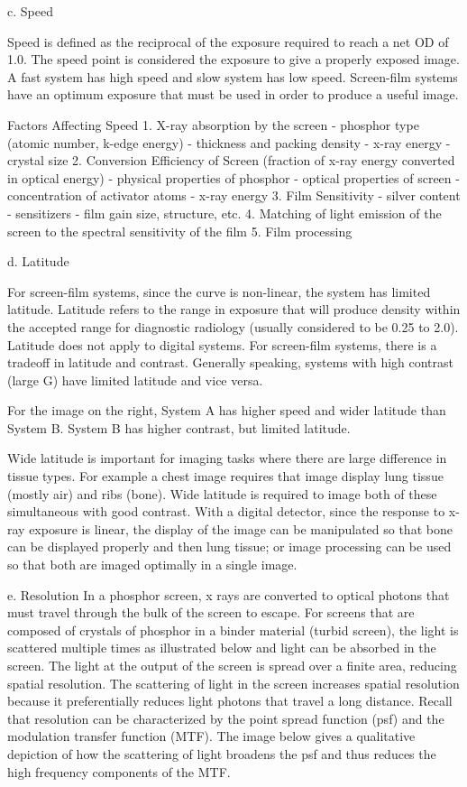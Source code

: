 \documentclass[mphy386-notes.tex]{subfiles}
\begin{document}
c. Speed 

Speed is defined as the reciprocal of the exposure required to reach a net OD of
1.0. The speed point is considered the exposure to give a properly exposed
image. A fast system has high speed and slow system has low speed.  Screen-film
systems have an optimum exposure that must be used in order to produce a useful
image.

Factors Affecting Speed
1.  X-ray absorption by the screen
- phosphor type (atomic number, k-edge energy)
- thickness and packing density
- x-ray energy
- crystal size
2.  Conversion Efficiency of Screen (fraction of x-ray energy converted in optical energy)
- physical properties of phosphor
- optical properties of screen
- concentration of activator atoms
- x-ray energy
3.  Film Sensitivity
- silver content
- sensitizers
- film gain size, structure, etc.
4.  Matching of light emission of the screen to the spectral sensitivity of the film
5.  Film processing

d.	Latitude

For screen-film systems, since the curve is non-linear, the system has limited
latitude. Latitude refers to the range in exposure that will produce density
within the accepted range for diagnostic radiology (usually considered to be
0.25 to 2.0). Latitude does not apply to digital systems. For screen-film
systems, there is a tradeoff in latitude and contrast. Generally speaking,
systems with high contrast (large G) have limited latitude and vice versa.

For the image on the right, System A has higher speed and wider latitude than
System B. System B has higher contrast, but limited latitude.

Wide latitude is important for imaging tasks where there are large difference in
tissue types. For example a chest image requires that image display lung tissue
(mostly air) and ribs (bone). Wide latitude is required to image both of these
simultaneous with good contrast. With a digital detector, since the response to
x-ray exposure is linear, the display of the image can be manipulated so that
bone can be displayed properly and then lung tissue; or image processing can be
used so that both are imaged optimally in a single image.

e. Resolution In a phosphor screen, x rays are converted to optical photons that
must travel through the bulk of the screen to escape. For screens that are
composed of crystals of phosphor in a binder material (turbid screen), the light
is scattered multiple times as illustrated below and light can be absorbed in
the screen. The light at the output of the screen is spread over a finite area,
reducing spatial resolution. The scattering of light in the screen increases
spatial resolution because it preferentially reduces light photons that travel a
long distance. Recall that resolution can be characterized by the point spread
function (psf) and the modulation transfer function (MTF). The image below
gives a qualitative depiction of how the scattering of light broadens the psf
and thus reduces the high frequency components of the MTF.
\end{document}
